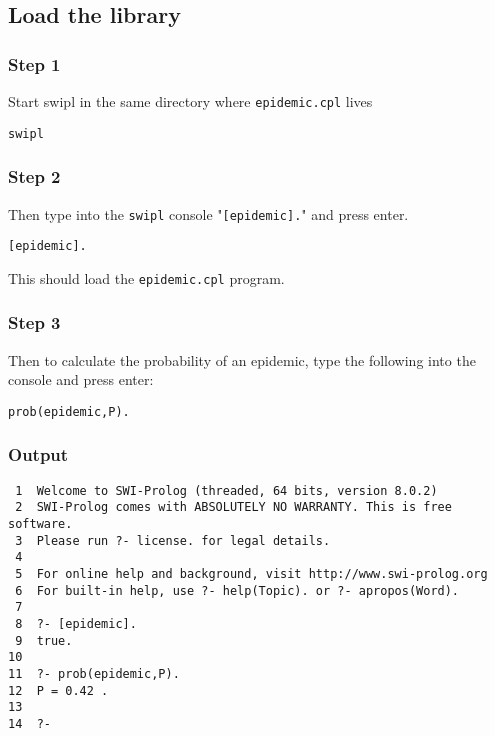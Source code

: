 \documentclass[11pt]{article}
\begin{document}
\subsection{Load the library}
\label{sec:orgc1b1c2a}

\subsubsection{Step 1}
\label{sec:org58394c5}
Start swipl in the same directory where \texttt{epidemic.cpl} lives

\begin{verbatim}
swipl
\end{verbatim}

\subsubsection{Step 2}
\label{sec:org8abb6fc}
Then type into the \texttt{swipl} console "\texttt{[epidemic].}" and press enter.

\begin{verbatim}
[epidemic].
\end{verbatim}


This should load the \texttt{epidemic.cpl} program.

\subsubsection{Step 3}
\label{sec:org48e8316}

Then to calculate the probability of an epidemic, type the following into the console and press enter:

\begin{verbatim}
prob(epidemic,P).
\end{verbatim}

\subsubsection{Output}
\label{sec:orgad686a9}
\begin{verbatim}
 1  Welcome to SWI-Prolog (threaded, 64 bits, version 8.0.2)
 2  SWI-Prolog comes with ABSOLUTELY NO WARRANTY. This is free software.
 3  Please run ?- license. for legal details.
 4  
 5  For online help and background, visit http://www.swi-prolog.org
 6  For built-in help, use ?- help(Topic). or ?- apropos(Word).
 7  
 8  ?- [epidemic].
 9  true.
10  
11  ?- prob(epidemic,P).
12  P = 0.42 .
13  
14  ?-
\end{verbatim}
\end{document}
